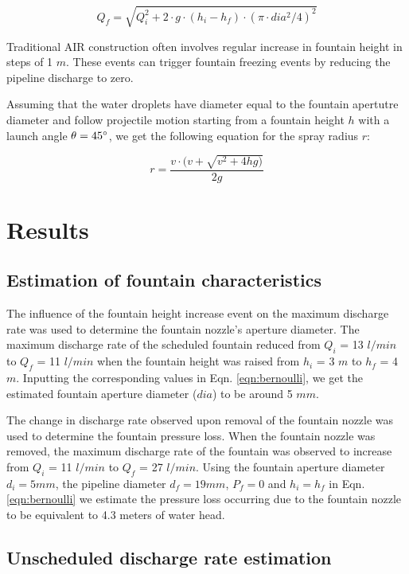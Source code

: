 \documentclass[tc, manuscript]{copernicus}
\begin{document}
\begin{equation}
  \label{eqn:discharge}
  Q_f = \sqrt{Q_i^2 + 2 \cdot g \cdot (h_i-h_f) \cdot (\pi \cdot dia^2/4)^2}
\end{equation}

Traditional AIR construction often involves regular increase in fountain height in steps of 1 $m$. These events
can trigger fountain freezing events by reducing the pipeline discharge to zero.

Assuming that the water droplets have diameter equal to the fountain apertutre diameter and follow projectile
motion starting from a fountain height $h$ with a launch angle $\theta = 45 ^{\circ}$, we get the following
equation for the spray radius $r$:

\begin{equation}
  \label{eqn:radf}
  r = \frac{v \cdot(v + \sqrt{v^2 + 4hg)}}{2g}
\end{equation}

\section{Results}

\subsection{Estimation of fountain characteristics}

The influence of the fountain height increase event on the maximum discharge rate was used to determine the
fountain nozzle's aperture diameter. The maximum discharge rate of the scheduled fountain reduced from $Q_i$ =
13 $l/min$ to $Q_f$ = 11 $l/min$ when the fountain height was raised from  $h_i$ = 3 $m$ to $h_f$ = 4 $m$.
Inputting the corresponding values in Eqn. \ref{eqn:bernoulli}, we get the estimated fountain aperture diameter
($dia$) to be around 5 $mm$. 

The change in discharge rate observed upon removal of the fountain nozzle was used to determine the fountain
pressure loss. When the fountain nozzle was removed, the maximum discharge rate of the fountain was observed to
increase from $Q_{i}$ = 11 $l/min$ to $Q_{f}$ = 27 $l/min$. Using the fountain aperture diameter $d_i = 5 mm$,
the pipeline diameter $d_f = 19 mm$, $P_{f} = 0$ and $h_{i} = h_{f}$ in Eqn. \ref{eqn:bernoulli} we estimate the
pressure loss occurring due to the fountain nozzle to be equivalent to 4.3 meters of water head.

\subsection{Unscheduled discharge rate estimation}
\end{document}
